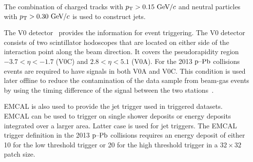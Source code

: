 The combination of charged tracks with  $p_{\rm T} > 0.15~\mathrm{GeV}\kern-0.05em/\kern-0.02em c$ and neutral particles with $p_{\rm T} > 0.30~\mathrm{GeV}\kern-0.05em/\kern-0.02em c$ is used to construct jets. 

The V0 detector~\cite{forwarddetectorsTdr} provides the information for event triggering. The V0 detector consists of two scintillator hodoscopes that are located on either side of the interaction point along the beam direction. It covers the pseudorapidity region $-3.7 < \eta < -1.7$ (V0C) and $2.8 < \eta < 5.1$ (V0A). For the 2013 $\mbox{p--Pb}$ collisions events are required to have signals in both V0A and V0C. This condition is used later offline to reduce the contamination of the data sample from beam-gas events by using the timing difference of the signal between the two stations~\cite{alicePerformance}.


EMCAL is also used to provide the jet trigger used in triggered datasets. EMCAL can be used to trigger on single shower deposits or energy deposits integrated over a larger area. Latter case is used for jet triggers. The EMCAL trigger definition in the 2013 $\mbox{p--Pb}$ collisions requires an energy deposit of either 10 \gev for the low threshold trigger or 20 \gev for the high threshold trigger in a $32\times32$ patch size.


